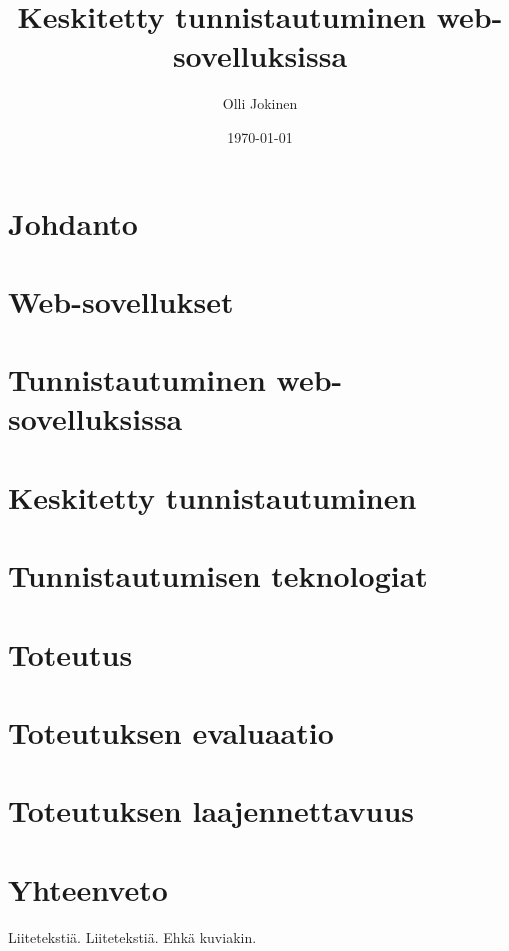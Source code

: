 \documentclass{tktltiki}
\begin{document}
\title{Keskitetty tunnistautuminen web-sovelluksissa}
\author{Olli Jokinen}
\date{\today}
\maketitle
\doublespacing
{}
\subject{Tietojenkäsittelytiede}
\additionalinformation{}
\begin{abstract}

\end{abstract}
\mytableofcontents
\section{Johdanto}

\section{Web-sovellukset}

\section{Tunnistautuminen web-sovelluksissa}

\section{Keskitetty tunnistautuminen}

\section{Tunnistautumisen teknologiat}

\section{Toteutus}

\section{Toteutuksen evaluaatio}

\section{Toteutuksen laajennettavuus}

\section{Yhteenveto}




\lastpage
\appendices
{}
Liitetekstiä.
Liitetekstiä. Ehkä kuviakin.
\end{document}
